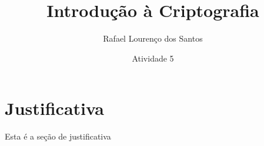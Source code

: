 \documentclass{report}
\title{Introdução à Criptografia}
\author{Rafael Lourenço dos Santos}
\date{Atividade 5}
\begin{document}
\maketitle

\section{Justificativa}

Esta é a seção de justificativa
\end{document}
